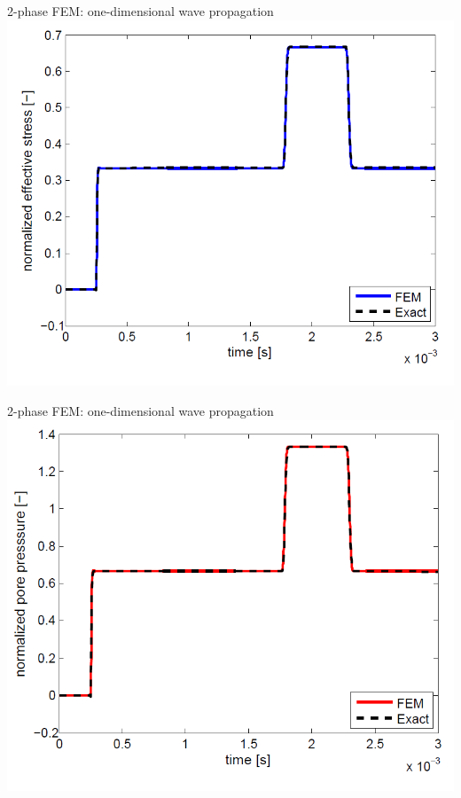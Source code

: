 \documentclass[mathserif,professionalfont,hyperref={pdfpagelabels=false}]{beamer}
\begin{document}
\begin{frame}{2-phase FEM: one-dimensional wave propagation}
\centering
\includegraphics[width=0.8\paperwidth,height=0.8\paperheight]{images/efs_1Dwave_prop}
\end{frame}
\begin{frame}{2-phase FEM: one-dimensional wave propagation}
\centering
\includegraphics[width=0.8\paperwidth,height=0.8\paperheight]{images/pp_1Dwave_prop}
\end{frame}
\end{document}
